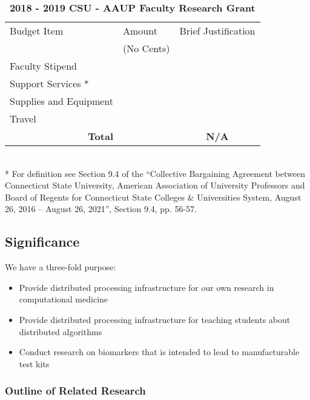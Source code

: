\documentclass[]{article}
\begin{document}
\begin{table}[H]
	\caption{\textbf{2018 - 2019 CSU - AAUP Faculty Research Grant}}
\begin{tabular}{|p{4cm}|p{3cm}|c|}
	\hline 
Budget Item	&Amount &  Brief Justification\\ 
 	&(No Cents) &   \\ 
	\hline 
Faculty Stipend	&  &  \\ 
	\hline 
Support Services *	&  &  \\ 
	\hline 
Supplies and Equipment	&  &  \\ 
	\hline 
Travel	&  &  \\ 
	\hline \hline
 \multicolumn{1}{|r|}{\textbf{Total}}	&  & \textbf{N/A} \\ 
	\hline 
\end{tabular} \\
* For definition see Section 9.4 of the ``Collective Bargaining Agreement between Connecticut State University, American Association of University Professors and Board of Regents for Connecticut State Colleges \& Universities System, August 26, 2016 – August 26, 2021'', Section 9.4, pp. 56-57.
\end{table}


\subsection{Significance}%
We have a three-fold purpose: 
\begin{itemize}
	\item Provide distributed processing infrastructure for our own research in computational medicine
	\item Provide distributed processing infrastructure for teaching students about distributed algorithms
	\item Conduct research on biomarkers that is intended to lead to manufacturable test kits
\end{itemize}

\subsubsection{Outline of Related Research}%
\end{document}
